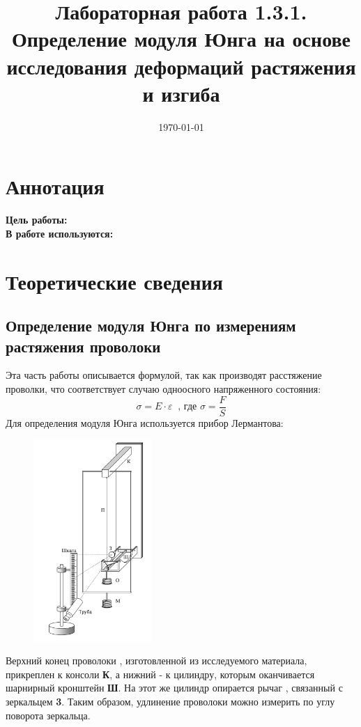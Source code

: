 \documentclass[a4paper,12pt]{article} %
\date{\today}
\title{Лабораторная работа 1.3.1. Определение модуля Юнга на основе
исследования деформаций растяжения и изгиба}
\date{}
\begin{document}
\maketitle
\section{Аннотация}
	
	\textbf{Цель работы:} \\
	\textbf{В работе используются:} 
	
	\section{Теоретические сведения}
	\subsection{Определение модуля Юнга по измерениям растяжения проволоки}
    
    Эта часть работы описывается формулой, так как производят расстяжение проволки, что соответствует случаю одноосного напряженного состояния:
    \[
        \sigma = E \cdot \varepsilon~\text{ , где } \sigma = \frac{F}{S}
    \]
    Для определения модуля Юнга используется прибор Лермантова:
    
    \begin{figure}[H]
        \centering
        \includegraphics[width=0.4\textwidth]{images/1.png}
    \end{figure}
    
    Верхний конец проволоки , изготовленной из исследуемого материала, прикреплен к консоли \textbf{К}, а нижний - к цилиндру, которым оканчивается шарнирный кронштейн \textbf{Ш}. На этот же цилиндр опирается рычаг , связанный с зеркальцем \textbf{3}. Таким образом, удлинение проволоки можно измерить по углу поворота зеркальца.
    
\end{document}
